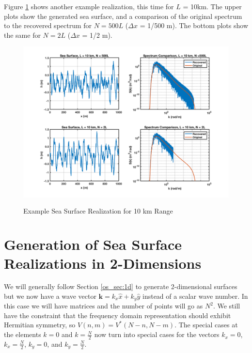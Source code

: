 Figure \ref{os_fig:7aa} shows another example realization, this time for $L$ = 10km. The upper plots show the generated sea surface, and a comparison of the original spectrum to the recovered spectrum for $N = 500L$ ($\Delta x$ = 1/500 m). The bottom plots show the same for $N=2L$ ($\Delta x$ = 1/2 m).
\begin{figure}[H]
  \begin{center}
\includegraphics[width=6in]{../media/Ocean_Surface/sea_surface_10000.png}
  \end{center}
  \renewcommand{\baselinestretch}{1} \small\normalsize
  \begin{quote}
    \caption[Example Sea Surface Realization for 10 km Range]{Example Sea Surface Realization for 10 km Range\label{os_fig:7aa}}
  \end{quote}
\end{figure}
\renewcommand{\baselinestretch}{2} \small\normalsize

\section{Generation of Sea Surface Realizations in 2-Dimensions}
We will generally follow Section \ref{os_sec:1d} to generate 2-dimensional surfaces but we now have a wave vector $\mathbf{k} = k_x\hat{x} + k_y\hat{y}$ instead of a scalar wave number. In this case we will have matrices and the number of points will go as $N^2$. We still have the constraint that the frequency domain representation should exhibit Hermitian symmetry, so $V(n,m) = V^*(N-n,N-m)$. The special cases at the elements $k = 0$ and $k = \frac{N}{2}$ now turn into special cases for the vectors $k_x = 0$, $k_x = \frac{N}{2}$, $k_y = 0$, and $k_y = \frac{N}{2}$. 

